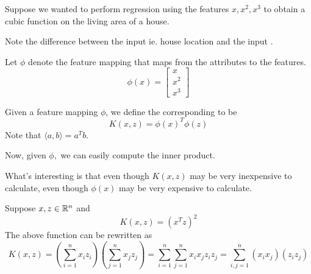 \documentclass[12pt]{scrartcl}
\begin{document}
Suppose we wanted to perform regression using the features $x, x^2, x^3$ to obtain a cubic function on the living area of a house.
\begin{note}
    Note the difference between the input  ie. house location and the input .
\end{note}
Let $\phi$ denote the feature mapping that maps from the attributes to the features.
\[\phi(x) = \begin{bmatrix}
    x\\ x^2\\x^3
\end{bmatrix}\]
\begin{definition}
    Given a feature mapping $\phi$, we define the corresponding  to be 
    \[K(x, z) = \phi(x)^T\phi(z)\]
    Note that $\langle a, b \rangle = a^Tb$.
\end{definition}
Now, given $\phi,$ we can easily compute the inner product.
\begin{note}
    What's interesting is that even though $K(x, z)$ may be very inexpensive to calculate, even though $\phi(x)$ may be very expensive to calculate.
\end{note}
\begin{example}
    Suppose $x, z \in \mathbb R^n$ and 
    \[K(x, z) = (x^Tz)^2\]
    The above function can be rewritten as 
    \[K(x, z) = (\sum_{i=1}^n x_iz_i)(\sum_{j=1}^nx_jz_j) =  \sum_{i=1}^n\sum_{j=1}^nx_ix_jz_iz_j = \sum_{i, j = 1}^n (x_ix_j)(z_iz_j)\]
\end{example}





\end{document}

